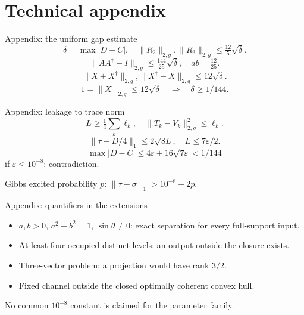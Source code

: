 \documentclass{beamer}
\begin{document}
\section{Technical appendix}
\begin{frame}{Appendix: the uniform gap estimate}
\[\delta=\max|D-C|,\quad\|R_2\|_{2,g},\|R_3\|_{2,g}\leq\tfrac{12}{5}\sqrt\delta.\]
 \[\|AA^\dagger-I\|_{2,g}\leq\tfrac{144}{25}\sqrt\delta,\quad ab=\tfrac{12}{25}.\]
 \[\|X+X^\dagger\|_{2,g},\|X^\dagger-X\|_{2,g}\leq12\sqrt\delta.\]
 \[1=\|X\|_{2,g}\leq12\sqrt\delta\quad\Longrightarrow\quad\delta\geq1/144.\]
\end{frame}
\begin{frame}{Appendix: leakage to trace norm}
\[L\geq\tfrac14\sum_k\ell_k,\quad\|T_k-V_k\|_{2,g}^2\leq\ell_k.\]
 \[\|\tau-D/4\|_1\leq2\sqrt{8L},\quad L\leq7\varepsilon/2.\]
 \[\max|D-C|\leq4\varepsilon+16\sqrt{7\varepsilon}<1/144\]
 if $\varepsilon\leq10^{-8}$: contradiction.

 Gibbs excited probability $p$: $\|\tau-\sigma\|_1>10^{-8}-2p$.
\end{frame}
\begin{frame}{Appendix: quantifiers in the extensions}
\begin{itemize}
 \item $a,b>0$, $a^2+b^2=1$, $\sin\theta\ne0$: exact separation for every full-support input.
 \item At least four occupied distinct levels: an output outside the closure exists.
 \item Three-vector problem: a projection would have rank $3/2$.
 \item Fixed channel outside the closed optimally coherent convex hull.
 \end{itemize}
 No common $10^{-8}$ constant is claimed for the parameter family.
\end{frame}
\end{document}
